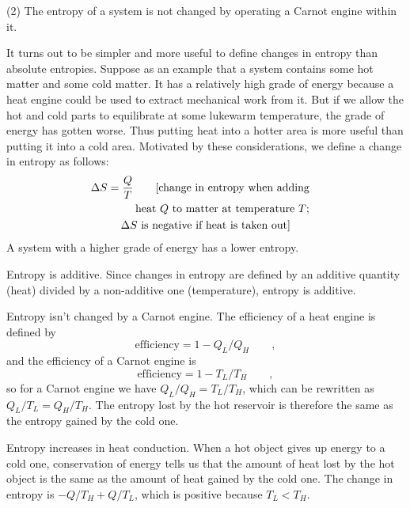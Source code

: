 (2) The entropy of a system is not changed by operating a
Carnot engine within it.

It turns out to be simpler and more useful to define changes
in entropy than absolute entropies. Suppose as an example
that a system contains some hot matter and some cold matter.
It has a relatively high grade of energy because a heat
engine could be used to extract mechanical work from it. But
if we allow the hot and cold parts to equilibrate at some
lukewarm temperature, the grade of energy has gotten worse.
Thus putting heat into a hotter area is more useful than
putting it into a cold area. Motivated by these
considerations, we define a change in entropy as
follows:
\begin{multline*}
        \Delta S  =  \frac{Q}{T}        \qquad \shoveright{\text{[change in entropy when adding}}\\                                                \shoveright{\text{heat $Q$ to matter at temperature $T$;}}\\
                                                {\text{$\Delta S$ is negative if heat is taken out]}}
\end{multline*}
A system with a higher grade of energy has a lower entropy.

\begin{eg}{Entropy is additive.}
Since changes in entropy are defined by an additive quantity
(heat) divided by a non-additive one (temperature), entropy
is additive.
\end{eg}


\begin{eg}{Entropy isn't changed by a Carnot engine.}\label{eg:carnotnoentropychange}
The efficiency of a heat engine is defined by
\begin{equation*}
        \text{efficiency}  =  1 -  Q_L/ Q_H  \qquad  ,
\end{equation*}
and the efficiency of a Carnot engine is
\begin{equation*}
        \text{efficiency}  =  1 -  T_L/ T_H \qquad  ,
\end{equation*}
so for a Carnot engine we have $Q_L/ Q_H =  T_L/ T_H$,
which can be rewritten as
$Q_L/ T_{L} =  Q_{H}/ T_H$.
The entropy lost by the hot reservoir is therefore
the same as the entropy gained by the cold one.
\end{eg}

\begin{eg}{Entropy increases in heat conduction.}\label{eg:s-increase-conduction}
When a hot object gives up energy to a cold one,
conservation of energy tells us that the amount of heat lost
by the hot object is the same as the amount of heat gained
by the cold one. The change in entropy is $- Q/ T_{H}+ Q/ T_L$, which
is positive because $ T_L< T_H$.
\end{eg}


